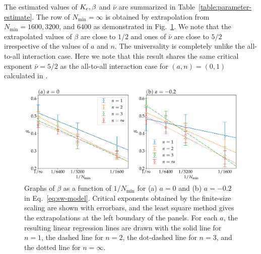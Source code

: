 The estimated values of $K_{\rm c}, \beta$ and $\bar{\nu}$
are summarized in Table~\ref{table:parameter-estimate}.
The row of $N_{\min}=\infty$ is obtained by extrapolation
from $N_{\min}=1600, 3200$, and $6400$
as demonstrated in Fig.~\ref{fig:ce_extrapolation}.
We note that the extrapolated values of $\beta$ are close to $1/2$
and ones of $\bar{\nu}$ are close to $5/2$
irrespective of the values of $a$ and $n$.
The universality is completely unlike the all-to-all interaction case.
Here we note that this result shares the same critical exponent $\bar{\nu}=5/2$
as the all-to-all interaction case for $(a,n)=(0,1)$
calculated in \cite{hong2007}.

\begin{figure}[t]
  \begin{center}
    \includegraphics[width=\textwidth]{figs/beta_N_dep.pdf}
  \end{center}
  \caption{Graphs of $\beta$ as a function of $1/N_{\min}$
    for (a) $a=0$ and (b) $a=-0.2$ in Eq.~\eqref{eq:sw-model}.
    Critical exponents obtained by the finite-size scaling
    are shown with errorbars,
    and the least square method gives the extrapolations
    at the left boundary of the panels.
    For each $a$, the resulting linear regression lines are drawn with the solid line for $n=1$,
    the dashed line for $n=2$, the dot-dashed line for $n=3$, and the dotted line for $n=\infty$.
  }
  \label{fig:ce_extrapolation}
\end{figure}

